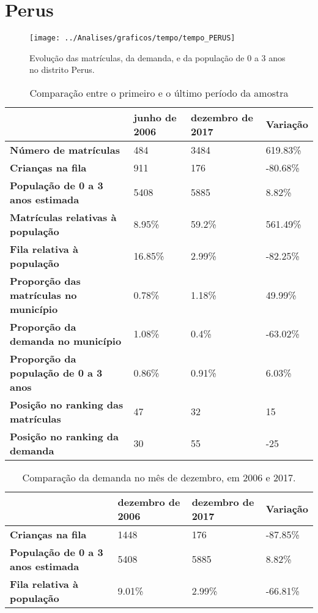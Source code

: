 \section{Perus}
\begin{figure}[H]
\centering
\texttt{[image: ../Analises/graficos/tempo/tempo\_PERUS]}
\caption{Evolução das matrículas, da demanda, e da população de 0 a 3 anos no distrito Perus.}
\end{figure}
\begin{table}[H]
\begin{tabular}{|l|l|l|l|}
\hline
\textbf{}                                      & \textbf{junho de 2006}       & \textbf{dezembro de 2017}    & \textbf{Variação} \\ \hline
\textbf{Número de matrículas}                  & 484 & 3484 & 619.83\% \\ \hline
\textbf{Crianças na fila}                      & 911 & 176 & -80.68\% \\ \hline
\textbf{População de 0 a 3 anos estimada}      & 5408 & 5885 & 8.82\% \\ \hline
\textbf{Matrículas relativas à população}      & 8.95\% & 59.2\% & 561.49\% \\ \hline
\textbf{Fila relativa à população}             & 16.85\% & 2.99\% & -82.25\% \\ \hline
\textbf{Proporção das matrículas no município} & 0.78\% & 1.18\% & 49.99\% \\ \hline
\textbf{Proporção da demanda no município}     & 1.08\% & 0.4\% & -63.02\% \\ \hline
\textbf{Proporção da população de 0 a 3 anos}  & 0.86\% & 0.91\% & 6.03\% \\ \hline
\textbf{Posição no ranking das matrículas}     & 47 & 32 & 15 \\ \hline
\textbf{Posição no ranking da demanda}         & 30 & 55 & -25 \\ \hline
\end{tabular}
\caption{Comparação entre o primeiro e o último período da amostra}
\end{table}
\begin{table}[H]
\begin{tabular}{|l|l|l|l|}
\hline
\textbf{}                                 & \textbf{dezembro de 2006} & \textbf{dezembro de 2017} & \textbf{Variação} \\ \hline
\textbf{Crianças na fila}                      & 1448 & 176 & -87.85\% \\ \hline
\textbf{População de 0 a 3 anos estimada}      & 5408 & 5885 & 8.82\% \\ \hline
\textbf{Fila relativa à população}             & 9.01\% & 2.99\% & -66.81\% \\ \hline
\end{tabular}
\caption{Comparação da demanda no mês de dezembro, em 2006 e 2017.}
\end{table}
